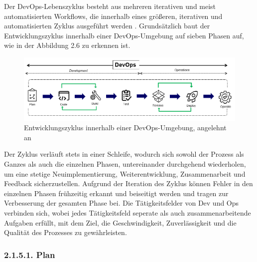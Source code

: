 Der DevOps-Lebenszyklus besteht aus mehreren iterativen und meist automatisierten Workflows, die innerhalb eines größeren, iterativen und automatisierten Zyklus ausgeführt werden \cite[S. 16]{halstenberg_devops_2020}. Grundsätzlich baut der Entwicklungszyklus innerhalb einer DevOps-Umgebung auf sieben Phasen auf, wie in der Abbildung 2.6 zu erkennen ist. 

\begin{figure}[h]
    \centering
    \includegraphics[scale=0.6]{Bilder/DevOps Lebenszyklus.png}
    \caption{Entwicklungszyklus innerhalb einer DevOps-Umgebung, angelehnt an \cite[S. 16]{halstenberg_devops_2020}}
\end{figure}

Der Zyklus verläuft stets in einer Schleife, wodurch sich sowohl der Prozess als Ganzes als auch die einzelnen Phasen, untereinander durchgehend wiederholen, um eine stetige Neuimplementierung, Weiterentwicklung, Zusammenarbeit und Feedback sicherzustellen. Aufgrund der Iteration des Zyklus können Fehler in den einzelnen Phasen frühzeitig erkannt und beiseitigt werden und tragen zur Verbesserung der gesamten Phase bei. Die Tätigkeitsfelder von Dev und Ops verbinden sich, wobei jedes Tätigkeitsfeld seperate als auch zusammenarbeitende Aufgaben erfüllt, mit dem Ziel, die Geschwindigkeit, Zuverlässigkeit und die Qualität des Prozesses zu gewährleisten. 

\subsubsection{2.1.5.1. Plan}$~$

